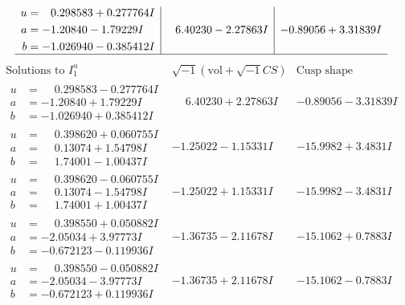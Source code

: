 \documentclass[1p]{elsarticle_modified}
\theoremstyle{definition}
\newcommand{\I}{\sqrt{-1}}
\begin{document}
$$\begin{array}{c|c|c}
\begin{aligned}
u &= \phantom{-}0.298583 + 0.277764 I \\
a &= -1.20840 - 1.79229 I \\
b &= -1.026940 - 0.385412 I\end{aligned}
 & \phantom{-}6.40230 - 2.27863 I & -0.89056 + 3.31839 I\\
 \hline 
 \end{array}$$\newpage$$\begin{array}{c|c|c}  
\text{Solutions to }I^u_{1}& \I (\text{vol} + \sqrt{-1}CS) & \text{Cusp shape}\\
 \hline 
\begin{aligned}
u &= \phantom{-}0.298583 - 0.277764 I \\
a &= -1.20840 + 1.79229 I \\
b &= -1.026940 + 0.385412 I\end{aligned}
 & \phantom{-}6.40230 + 2.27863 I & -0.89056 - 3.31839 I \\ \hline\begin{aligned}
u &= \phantom{-}0.398620 + 0.060755 I \\
a &= \phantom{-}0.13074 + 1.54798 I \\
b &= \phantom{-}1.74001 - 1.00437 I\end{aligned}
 & -1.25022 - 1.15331 I & -15.9982 + 3.4831 I \\ \hline\begin{aligned}
u &= \phantom{-}0.398620 - 0.060755 I \\
a &= \phantom{-}0.13074 - 1.54798 I \\
b &= \phantom{-}1.74001 + 1.00437 I\end{aligned}
 & -1.25022 + 1.15331 I & -15.9982 - 3.4831 I \\ \hline\begin{aligned}
u &= \phantom{-}0.398550 + 0.050882 I \\
a &= -2.05034 + 3.97773 I \\
b &= -0.672123 - 0.119936 I\end{aligned}
 & -1.36735 - 2.11678 I & -15.1062 + 0.7883 I \\ \hline\begin{aligned}
u &= \phantom{-}0.398550 - 0.050882 I \\
a &= -2.05034 - 3.97773 I \\
b &= -0.672123 + 0.119936 I\end{aligned}
 & -1.36735 + 2.11678 I & -15.1062 - 0.7883 I \\ \hline\begin{aligned}

\end{aligned}
\end{array}$$
\end{document}
